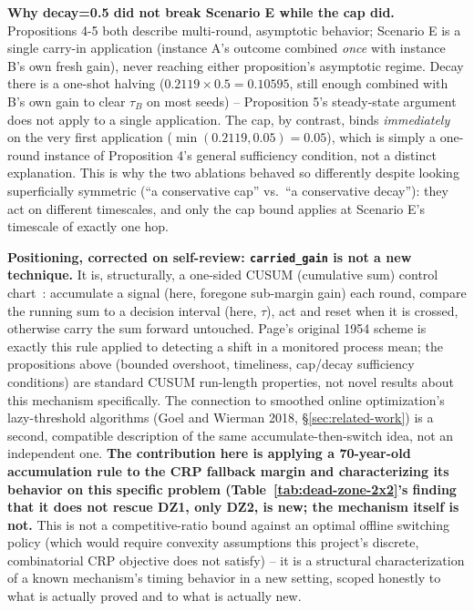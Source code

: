 \documentclass[11pt]{article}
\begin{document}
\textbf{Why decay=0.5 did not break Scenario E while the cap did.}
Propositions 4-5 both describe multi-round, asymptotic behavior; Scenario
E is a single carry-in application (instance A's outcome combined
\emph{once} with instance B's own fresh gain), never reaching either
proposition's asymptotic regime. Decay there is a one-shot halving
($0.2119 \times 0.5 = 0.10595$, still enough combined with B's own gain to
clear $\tau_B$ on most seeds) -- Proposition 5's steady-state argument
does not apply to a single application. The cap, by contrast, binds
\emph{immediately} on the very first application
($\min(0.2119, 0.05)=0.05$), which is simply a one-round instance of
Proposition 4's general sufficiency condition, not a distinct
explanation. This is why the two ablations behaved so differently despite
looking superficially symmetric (``a conservative cap'' vs.\ ``a
conservative decay''): they act on different timescales, and only the cap
bound applies at Scenario E's timescale of exactly one hop.

\textbf{Positioning, corrected on self-review: \texttt{carried\_gain} is not
a new technique.} It is, structurally, a one-sided CUSUM (cumulative sum)
control chart~\cite{page1954}: accumulate a signal (here, foregone
sub-margin gain) each round, compare the running sum to a decision interval
(here, $\tau$), act and reset when it is crossed, otherwise carry the sum
forward untouched. Page's original 1954 scheme is exactly this rule applied
to detecting a shift in a monitored process mean; the propositions above
(bounded overshoot, timeliness, cap/decay sufficiency conditions) are
standard CUSUM run-length properties, not novel results about this
mechanism specifically. The connection to smoothed online optimization's
lazy-threshold algorithms (Goel and Wierman 2018, \S\ref{sec:related-work})
is a second, compatible description of the same accumulate-then-switch
idea, not an independent one. \textbf{The contribution here is applying a
70-year-old accumulation rule to the CRP fallback margin and characterizing
its behavior on this specific problem (Table~\ref{tab:dead-zone-2x2}'s
finding that it does not rescue DZ1, only DZ2, is new; the mechanism
itself is not.} This is not a competitive-ratio bound against an optimal
offline switching policy (which would require convexity assumptions this
project's discrete, combinatorial CRP objective does not satisfy) -- it is
a structural characterization of a known mechanism's timing behavior in a
new setting, scoped honestly to what is actually proved and to what is
actually new.
\end{document}

